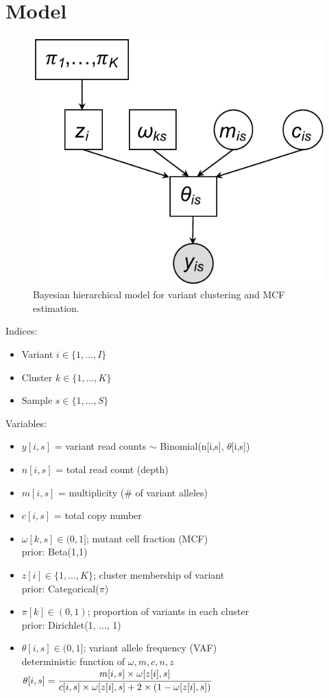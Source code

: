 \documentclass{article}
\newcommand{\forceindent}{\vspace{0em}\leavevmode{\parindent=2em\indent}} %
\begin{document}
	
	\section{Model}
	
	\begin{figure}
		\footnotesize
		\centering
		\includegraphics[width=.35\textwidth]{figs/graphical-model-6.pdf}
		\vspace{0em}
		\caption{Bayesian hierarchical model for variant clustering and MCF estimation.}
		\label{fig:model}
	\end{figure}
	
	
	Indices: 
	\begin{itemize}
		\item Variant $i \in \{1, ..., I\}$
		\item Cluster $k \in \{1, ..., K\}$
		\item Sample $s \in \{1, ..., S\}$
	\end{itemize}
	
	Variables:
	\begin{itemize}
		\item $y[i,s]$ = variant read counts $\sim$ Binomial(n[i,s], $\theta$[i,s])
		\item $n[i,s]$ = total read count (depth)
		\item $m[i,s]$ = multiplicity (\# of variant alleles)
		\item $c[i,s]$ = total copy number 
		
		\item $\omega[k,s] \in (0, 1]$; mutant cell fraction (MCF) \\
		\forceindent prior: Beta(1,1)
		
		\item $z[i] \in \{1, ..., K\}$; cluster membership of variant \\
		\forceindent prior: Categorical($\pi$)
		
		\item $\pi[k] \in (0,1)$; proportion of variants in each cluster \\
		\forceindent prior: Dirichlet(1, ..., 1)
		
		\item $\theta[i,s] \in (0, 1]$; variant allele frequency (VAF) \\
		\forceindent deterministic function of $\omega, m, c, n, z$ \\
		\forceindent $\theta[i,s] = \cfrac{m[i,s] \times \omega[z[i], s]}{c[i,s] \times \omega[z[i], s] + 2\times(1 - \omega[z[i], s])}$
	\end{itemize}
	
\end{document}
